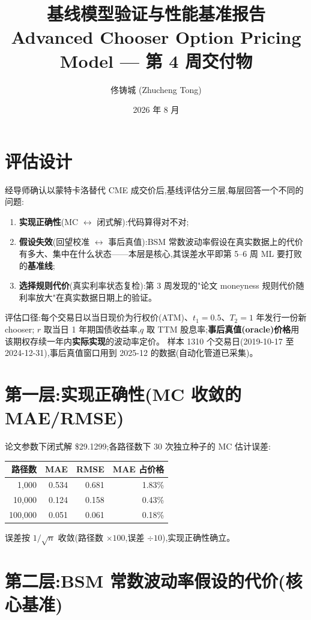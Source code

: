 \documentclass[11pt]{ctexart}
\title{\textbf{基线模型验证与性能基准报告}\\
\large Advanced Chooser Option Pricing Model --- 第 4 周交付物}
\author{佟铸城 (Zhucheng Tong)}
\date{2026 年 8 月}
\begin{document}
\maketitle

\section{评估设计}
经导师确认以蒙特卡洛替代 CME 成交价后,基线评估分三层,每层回答一个不同的问题:
\begin{enumerate}
  \item \textbf{实现正确性}(MC $\leftrightarrow$ 闭式解):代码算得对不对;
  \item \textbf{假设失效}(回望校准 $\leftrightarrow$ 事后真值):BSM 常数波动率假设在真实数据上的代价有多大、集中在什么状态——本层是核心,其误差水平即第 5--6 周 ML 要打败的\textbf{基准线};
  \item \textbf{选择规则代价}(真实利率状态复检):第 3 周发现的"论文 moneyness 规则代价随利率放大"在真实数据日期上的验证。
\end{enumerate}

评估口径:每个交易日以当日现价为行权价(ATM)、$t_1=0.5$、$T_2=1$ 年发行一份新 chooser;
$r$ 取当日 1 年期国债收益率,$q$ 取 TTM 股息率;\textbf{事后真值(oracle)价格}用该期权存续一年内\textbf{实际实现}的波动率定价。
样本 1310 个交易日(2019-10-17 至 2024-12-31),事后真值窗口用到 2025-12 的数据(自动化管道已采集)。

\section{第一层:实现正确性(MC 收敛的 MAE/RMSE)}
论文参数下闭式解 \$29.1299;各路径数下 30 次独立种子的 MC 估计误差:

\begin{center}
\begin{tabular}{rrrr}
\toprule
\textbf{路径数} & \textbf{MAE} & \textbf{RMSE} & \textbf{MAE 占价格} \\
\midrule
1{,}000 & 0.534 & 0.681 & 1.83\% \\
10{,}000 & 0.124 & 0.158 & 0.43\% \\
100{,}000 & 0.051 & 0.061 & 0.18\% \\
\bottomrule
\end{tabular}
\end{center}

误差按 $1/\sqrt{n}$ 收敛(路径数 $\times100$,误差 $\div10$),实现正确性确立。

\section{第二层:BSM 常数波动率假设的代价(核心基准)}
\end{document}
